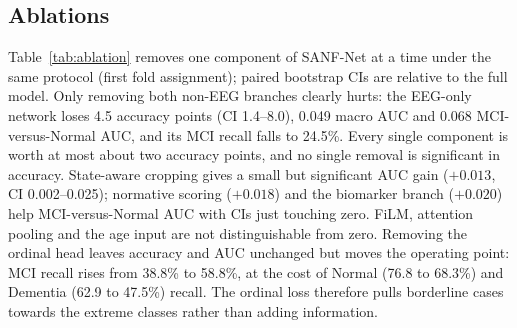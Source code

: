 \documentclass[conference]{IEEEtran}
\begin{document}
\subsection{Ablations}
\label{sec:ablation}
Table~\ref{tab:ablation} removes one component of SANF-Net at a time under the same protocol (first
fold assignment); paired bootstrap CIs are relative to the full model. Only removing both
non-EEG branches clearly hurts: the EEG-only network loses 4.5 accuracy points (CI 1.4--8.0), 0.049
macro AUC and 0.068 MCI-versus-Normal AUC, and its MCI recall falls to 24.5\%. Every single
component is worth at most about two accuracy points, and no single removal is significant in
accuracy. State-aware cropping gives a small but significant AUC gain ($+0.013$, CI 0.002--0.025);
normative scoring ($+0.018$) and the biomarker branch ($+0.020$) help MCI-versus-Normal AUC with CIs
just touching zero. FiLM, attention pooling and the age input are not distinguishable from zero.
Removing the ordinal head leaves accuracy and AUC unchanged but moves the operating point: MCI recall
rises from 38.8\% to 58.8\%, at the cost of Normal (76.8 to 68.3\%) and Dementia (62.9 to 47.5\%)
recall. The ordinal loss therefore pulls borderline cases towards the extreme classes rather than
adding information.

\begin{table}[t]
\centering
\caption{Ablations (5-fold CV out-of-fold, $n=1069$, first fold assignment).}
\label{tab:ablation}
\end{table}
\end{document}
